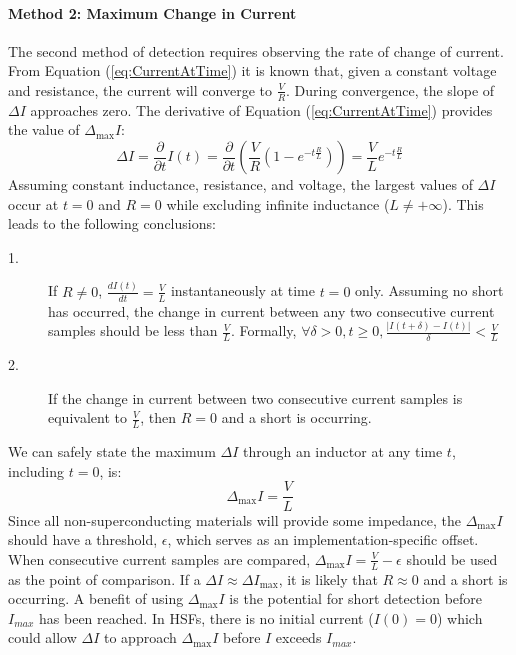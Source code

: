 \paragraph{Method 2: Maximum Change in Current}
The second method of detection requires observing the rate of change of current.
From Equation (\ref{eq:CurrentAtTime}) it is known that, given a constant voltage and resistance, the current will converge to $\frac{V}{R}$.
During convergence, the slope of $\Delta I$ approaches zero.
The derivative of Equation (\ref{eq:CurrentAtTime}) provides the value of $\Delta_{\max}I$:
\begin{equation}
\Delta I = \frac{\partial}{\partial t}I(t) = \frac{\partial}{\partial t}(\frac{V}{R}(1-e^{-t \frac{R}{L}})) = \frac{V}{L}e^{-t \frac{R}{L}}
\end{equation}
Assuming constant inductance, resistance, and voltage, the largest values of $\Delta I$ occur at $t = 0$ and $R = 0$ while excluding infinite inductance ($L \neq +\infty$).
This leads to the following conclusions:
\begin{description}
\item [1.] If $R \neq 0$, $\frac{dI(t)}{dt} = \frac{V}{L}$ instantaneously at time $t = 0$ only.
Assuming no short has occurred, the change in current between any two consecutive current samples should be less than $\frac{V}{L}$.
Formally, $\forall \delta > 0, t \geq 0, \frac{|I(t+\delta) - I(t)|}{\delta} < \frac{V}{L}$ 
\item [2.] If the change in current between two consecutive current samples is equivalent to $\frac{V}{L}$, then $R = 0$ and a short is occurring.
\end{description}

We can safely state the maximum $\Delta I$ through an inductor at any time $t$, including $t = 0$, is:
\begin{equation}\label{eq:DeltaMax}
\Delta_{\max}I = \frac{V}{L} \nonumber
\end{equation}
Since all non-superconducting materials will provide some impedance, the $\Delta_{\max}I$ should have a threshold, $\epsilon$, which serves as an implementation-specific offset.
When consecutive current samples are compared, $\Delta_{\max} I = \frac{V}{L} - \epsilon$ should be used as the point of comparison.
If a $\Delta I \approx \Delta I_{\max}$, it is likely that $R \approx 0$ and a short is occurring.
A benefit of using $\Delta_{\max}I$ is the potential for short detection before $I_{max}$ has been reached.
In HSFs, there is no initial current ($I(0) = 0$) which could allow $\Delta I$ to approach $\Delta_{\max}I$ before $I$ exceeds $I_{max}$.
